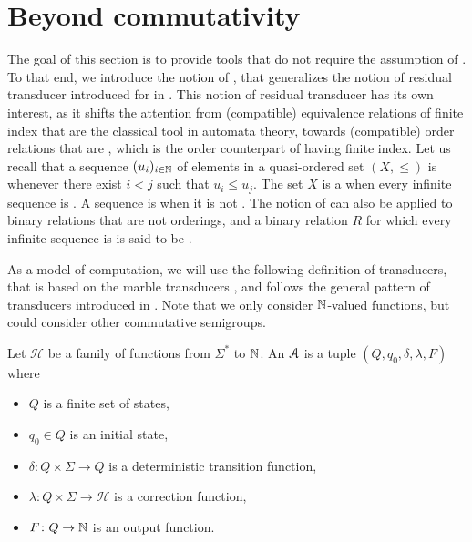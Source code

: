 \section{Beyond commutativity}
\label{beyond-commutative:sec}

\AP The goal of this section is to provide tools that do not require the
assumption of . To that end, we introduce the notion of
, that generalizes the notion of residual
transducer introduced for  in \cite{CDTL23}.
This notion of residual transducer has its own interest, as it shifts the
attention from (compatible) equivalence relations of finite index that are the
classical tool in automata theory, towards (compatible) order relations that
are , which is the order counterpart of having finite
index. Let us recall that a sequence $(u_i)_{i \in \mathbb{N}}$ of elements in a
quasi-ordered set $(X, \leq)$ is  whenever there exist $i < j$ such
that $u_i \leq u_j$. The set $X$ is a  when every
infinite sequence is . A sequence is  when it is not
. The notion of  can also be applied to
binary relations that are not orderings, and a binary relation $R$ for which
every infinite sequence is  is said to be 
\cite{MELL98}.

As a model of computation, we will use the following definition of transducers,
that is based on the marble transducers \cite{EHB99}, and follows the general
pattern of transducers introduced in \cite{CDTL23}. Note that we only consider
$\mathbb{N}$-valued functions, but could consider other commutative semigroups.

\begin{definition}
    Let $\mathcal{H}$ be a family of functions
    from $\Sigma^*$ to $\mathbb{N}$.
    An  $\mathcal{A}$ is
    a tuple $(Q, q_0, \delta, \lambda, F)$ where
    \begin{itemize}
        \item $Q$ is a finite set of states,
        \item $q_0 \in Q$ is an initial state,
        \item $\delta \colon Q \times \Sigma \to Q$
            is a deterministic transition function,
        \item $\lambda \colon Q \times \Sigma \to \mathcal{H}$
            is a correction function,
        \item $F \colon Q \to \mathbb{N}$ is an output function.
    \end{itemize}
\end{definition}

